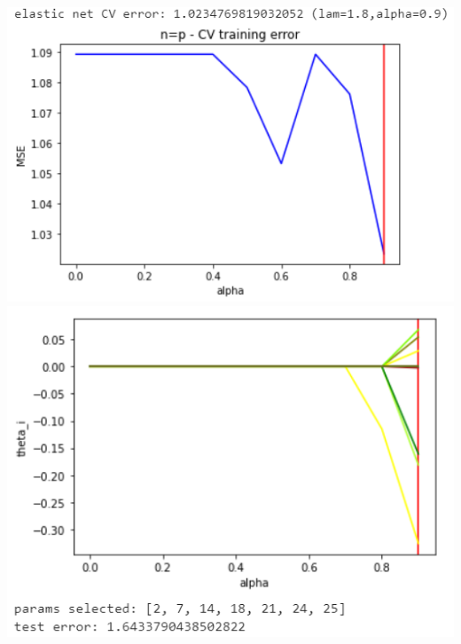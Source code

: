\documentclass[11pt]{article}
\begin{document}
\begin{center}
\includegraphics[scale=0.7]{charts/en_corr_n_eq_p_err.PNG}
\includegraphics[scale=0.7]{charts/en_corr_n_eq_p_thetas.PNG}


\end{center}
\end{document}
